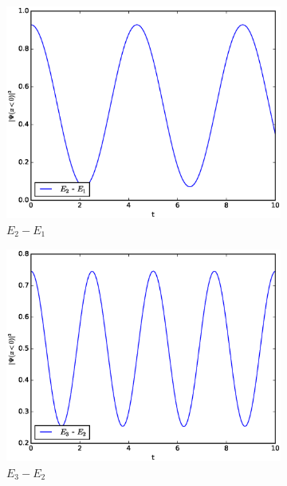 \documentclass[a4paper, 11pt]{scrartcl}
\begin{document}
\begin{figure}[H]
\begin{subfigure}[b]{0.5\linewidth}
  \centering
  \includegraphics[width=0.9\linewidth]{probability_left21}
  \caption{$E_2 - E_1$}
  \label{fig:21}
  \vspace{4ex}
\end{subfigure}%
\begin{subfigure}[b]{0.5\linewidth}
  \centering
  \includegraphics[width=0.9\linewidth]{probability_left32}
  \caption{$E_3 - E_2$}
  \label{fig:32}
  \vspace{4ex}
\end{subfigure}
\begin{subfigure}[b]{0.5\linewidth}
  \centering

\end{subfigure}
\end{figure}
\end{document}
